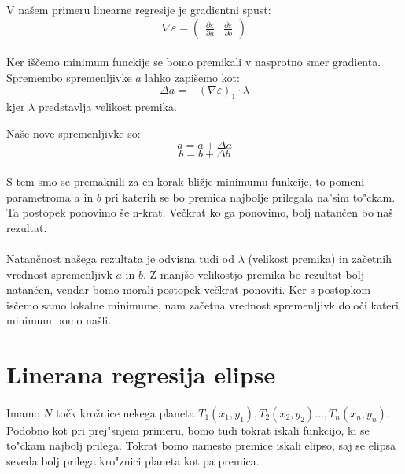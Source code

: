 \documentclass[a4paper, 12pt]{article}
\begin{document}
	V našem primeru linearne regresije je gradientni spust:
	$$\nabla \varepsilon =
	\begin{pmatrix}
	\frac{\partial \varepsilon}{\partial a} &
	\frac{\partial \varepsilon}{\partial b} 
	\end{pmatrix}$$
	
	\paragraph{}
	Ker iščemo minimum funckije se bomo premikali v nasprotno smer gradienta. Spremembo spremenljivke $a$ lahko zapišemo kot:
	$$\Delta a = -(\nabla \varepsilon)_1 \cdot \lambda$$
	kjer $\lambda$ predstavlja velikost premika.
	
	Naše nove spremenljivke so:
	$$ a = a + \Delta a$$
	$$ b = b + \Delta b$$
	
	\paragraph{}
	S tem smo se premaknili za en korak bližje minimumu funkcije, to pomeni parametroma $a$ in $b$ pri katerih se bo premica najbolje prilegala na"sim to"ckam. Ta postopek ponovimo še n-krat. Večkrat ko ga ponovimo, bolj natančen bo naš rezultat.
	
	\paragraph{}
	Natančnost našega rezultata je odvisna tudi od $\lambda$ (velikost premika) in začetnih vrednost spremenljivk $a$ in $b$. Z manjšo velikostjo premika bo rezultat bolj natančen, vendar bomo morali postopek večkrat ponoviti. Ker s postopkom isčemo samo lokalne minimume, nam začetna vrednost spremenljivk določi kateri minimum bomo našli.


	\section*{Linerana regresija elipse}
	\paragraph{}
	Imamo $N$ točk krožnice nekega planeta $T_1(x_1, y_1), T_2(x_2, y_2) \ldots, T_n(x_n, y_n)$. Podobno kot pri prej"snjem primeru, bomo tudi tokrat iskali funkcijo, ki se to"ckam najbolj prilega. Tokrat bomo namesto premice iskali elipso, saj se elipsa seveda bolj prilega kro"znici planeta kot pa premica.
	
\end{document}
